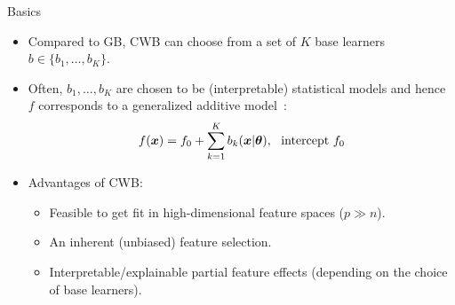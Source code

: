 \documentclass[t,10pt]{beamer}
\begin{document}
\begin{frame}{Basics}
  \begin{itemize}
    \item
      Compared to GB, CWB can choose from a set of $K$ base learners $b \in \{b_1, \dots, b_K\}$.


    \item
      Often, $b_1, \dots, b_K$ are chosen to be (interpretable) statistical models and hence $f$ corresponds to a generalized additive model~\citep[GAM;][]{hastie2017generalized}: \[f(\xv) = f_0 + \sum_{k=1}^K b_k(\xv | \tb), \ \ \text{intercept}\ f_0\]

    \item
      Advantages of CWB:
      \begin{itemize}
        \item
          Feasible to get fit in high-dimensional feature spaces ($p \gg n$).

        \item
          An inherent (unbiased) feature selection.

        \item
          Interpretable/explainable partial feature effects (depending on the choice of base learners).
      \end{itemize}
  \end{itemize}
\end{frame}
\end{document}
